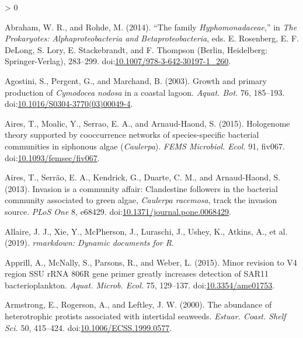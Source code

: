 \documentclass[
  12pt,
]{article}
\newlength{\cslhangindent}
\newenvironment{CSLReferences}[2] %
 {%
  \setlength{\parindent}{0pt}
  \ifodd #1 \everypar{\setlength{\hangindent}{\cslhangindent}}\ignorespaces\fi
  \ifnum #2 > 0
  \setlength{\parskip}{#2\baselineskip}
  \fi
 }%
 {}
\begin{document}
\setlength{\emergencystretch}{3.7em}

\hypertarget{refs}{}
\begin{CSLReferences}{1}{0}
\leavevmode\hypertarget{ref-Abraham2014}{}%
Abraham, W. R., and Rohde, M. (2014). {``The family
{\emph{Hyphomonadaceae}},''} in \emph{The {Prokaryotes}:
{Alphaproteobacteria} and {Betaproteobacteria}}, eds. E. Rosenberg, E.
F. DeLong, S. Lory, E. Stackebrandt, and F. Thompson ({Berlin,
Heidelberg}: {Springer-Verlag}), 283--299.
doi:\href{https://doi.org/10.1007/978-3-642-30197-1_260}{10.1007/978-3-642-30197-1\_260}.

\leavevmode\hypertarget{ref-Agostini2003}{}%
Agostini, S., Pergent, G., and Marchand, B. (2003). Growth and primary
production of {\emph{Cymodocea nodosa}} in a coastal lagoon.
\emph{Aquat. Bot.} 76, 185--193.
doi:\href{https://doi.org/10.1016/S0304-3770(03)00049-4}{10.1016/S0304-3770(03)00049-4}.

\leavevmode\hypertarget{ref-Aires2015}{}%
Aires, T., Moalic, Y., Serrao, E. A., and Arnaud-Haond, S. (2015).
Hologenome theory supported by cooccurrence networks of species-specific
bacterial communities in siphonous algae ({\emph{Caulerpa}}). \emph{FEMS
Microbiol. Ecol.} 91, fiv067.
doi:\href{https://doi.org/10.1093/femsec/fiv067}{10.1093/femsec/fiv067}.

\leavevmode\hypertarget{ref-Aires2013}{}%
Aires, T., Serrão, E. A., Kendrick, G., Duarte, C. M., and Arnaud-Haond,
S. (2013). Invasion is a community affair: {Clandestine} followers in
the bacterial community associated to green algae, {\emph{Caulerpa
racemosa}}, track the invasion source. \emph{PLoS One} 8, e68429.
doi:\href{https://doi.org/10.1371/journal.pone.0068429}{10.1371/journal.pone.0068429}.

\leavevmode\hypertarget{ref-Allaire2019}{}%
Allaire, J. J., Xie, Y., McPherson, J., Luraschi, J., Ushey, K., Atkins,
A., et al. (2019). \emph{{rmarkdown}: Dynamic documents for {R}}.

\leavevmode\hypertarget{ref-Apprill2015}{}%
Apprill, A., McNally, S., Parsons, R., and Weber, L. (2015). Minor
revision to {V4} region {SSU rRNA 806R} gene primer greatly increases
detection of {SAR11} bacterioplankton. \emph{Aquat. Microb. Ecol.} 75,
129--137. doi:\href{https://doi.org/10.3354/ame01753}{10.3354/ame01753}.

\leavevmode\hypertarget{ref-Armstrong2000}{}%
Armstrong, E., Rogerson, A., and Leftley, J. W. (2000). The abundance of
heterotrophic protists associated with intertidal seaweeds.
\emph{Estuar. Coast. Shelf Sci.} 50, 415--424.
doi:\href{https://doi.org/10.1006/ECSS.1999.0577}{10.1006/ECSS.1999.0577}.


\end{CSLReferences}
\end{document}
